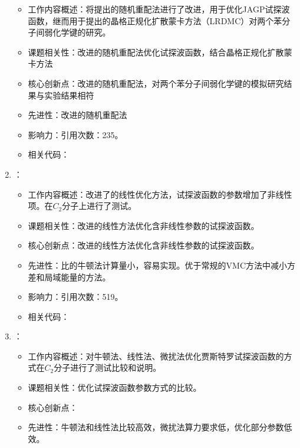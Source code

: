 \begin{enumerate}
            \begin{itemize}
                \item 工作内容概述：将\citet{sorella2001generalized}提出的随机重配法进行了改进，用于优化JAGP试探波函数，继而用于\citet{casula2005diffusion}提出的晶格正规化扩散蒙卡方法（LRDMC）对两个苯分子间弱化学键的研究。
                \item 课题相关性：改进的随机重配法优化试探波函数，结合晶格正规化扩散蒙卡方法
                \item 核心创新点：改进的随机重配法，对两个苯分子间弱化学键的模拟研究结果与实验结果相符
                \item 先进性：改进的随机重配法
                \item 影响力：引用次数：235。
                \item 相关代码：
            \end{itemize}
        \item \citet{umrigar2007alleviation}：
            \begin{itemize}
                \item 工作内容概述：改进了\citet{nightingale2001optimization}的线性优化方法，试探波函数的参数增加了非线性项。在$C_2$分子上进行了测试。
                \item 课题相关性：改进的线性方法优化含非线性参数的试探波函数。
                \item 核心创新点：改进的线性方法优化含非线性参数的试探波函数。
                \item 先进性：比\citet{umrigar2005energy}的牛顿法计算量小，容易实现。优于常规的VMC方法中减小方差和局域能量的方法。
                \item 影响力：引用次数：519。
                \item 相关代码：
            \end{itemize}
        \item \citet{toulouse2007optimization}：
            \begin{itemize}
                \item 工作内容概述：对牛顿法\citep{umrigar2005energy}、线性法\citep{umrigar2007alleviation}、微扰法\citep{scemama2006simple}优化贾斯特罗试探波函数的方式在$C_2$分子进行了测试比较和说明。
                \item 课题相关性：优化试探波函数参数方式的比较。
                \item 核心创新点：
                \item 先进性：牛顿法和线性法比较高效，微扰法算力要求低，优化部分参数低效。

\end{itemize}
\end{enumerate}
